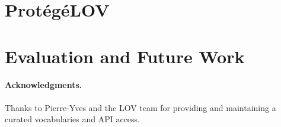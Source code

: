 \documentclass[runningheads,a4paper]{llncs}
\begin{document}
\section{Prot{\'e}g{\'e}LOV}\label{sec:classification}




\section{Evaluation and Future Work}\label{sec:conclusion}





\paragraph{\textbf{Acknowledgments.}} %
Thanks to Pierre-Yves and the LOV team for providing and maintaining a curated vocabularies and API access.


\nocite{*}

\end{document}
